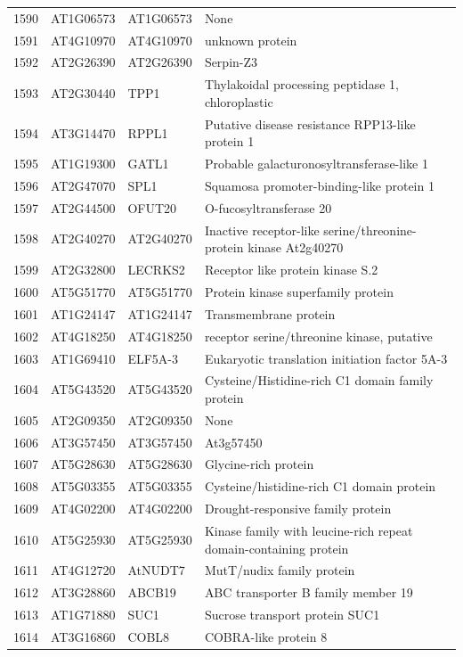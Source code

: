 \documentclass[11pt]{article}
\begin{document}
\begin{center}
\begin{tabular}{rlll}
1590 & AT1G06573 & AT1G06573 & None\\
1591 & AT4G10970 & AT4G10970 & unknown protein\\
1592 & AT2G26390 & AT2G26390 & Serpin-Z3\\
1593 & AT2G30440 & TPP1 & Thylakoidal processing peptidase 1, chloroplastic\\
1594 & AT3G14470 & RPPL1 & Putative disease resistance RPP13-like protein 1\\
1595 & AT1G19300 & GATL1 & Probable galacturonosyltransferase-like 1\\
1596 & AT2G47070 & SPL1 & Squamosa promoter-binding-like protein 1\\
1597 & AT2G44500 & OFUT20 & O-fucosyltransferase 20\\
1598 & AT2G40270 & AT2G40270 & Inactive receptor-like serine/threonine-protein kinase At2g40270\\
1599 & AT2G32800 & LECRKS2 & Receptor like protein kinase S.2\\
1600 & AT5G51770 & AT5G51770 & Protein kinase superfamily protein\\
1601 & AT1G24147 & AT1G24147 & Transmembrane protein\\
1602 & AT4G18250 & AT4G18250 & receptor serine/threonine kinase, putative\\
1603 & AT1G69410 & ELF5A-3 & Eukaryotic translation initiation factor 5A-3\\
1604 & AT5G43520 & AT5G43520 & Cysteine/Histidine-rich C1 domain family protein\\
1605 & AT2G09350 & AT2G09350 & None\\
1606 & AT3G57450 & AT3G57450 & At3g57450\\
1607 & AT5G28630 & AT5G28630 & Glycine-rich protein\\
1608 & AT5G03355 & AT5G03355 & Cysteine/histidine-rich C1 domain protein\\
1609 & AT4G02200 & AT4G02200 & Drought-responsive family protein\\
1610 & AT5G25930 & AT5G25930 & Kinase family with leucine-rich repeat domain-containing protein\\
1611 & AT4G12720 & AtNUDT7 & MutT/nudix family protein\\
1612 & AT3G28860 & ABCB19 & ABC transporter B family member 19\\
1613 & AT1G71880 & SUC1 & Sucrose transport protein SUC1\\
1614 & AT3G16860 & COBL8 & COBRA-like protein 8\\

\end{tabular}
\end{center}
\end{document}
